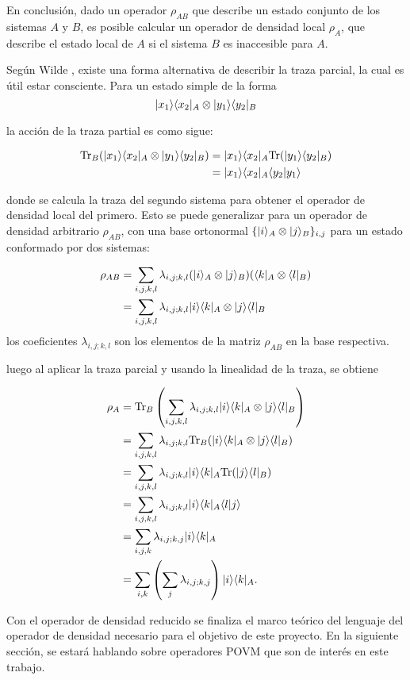 En conclusión, dado un operador $\rho_{AB}$ que describe un estado conjunto de los sistemas $A$ y $B$, es posible calcular un operador de densidad local $\rho_A$, que describe el estado local de $A$ si el sistema $B$ es inaccesible para $A$.


Según Wilde {\cite{wilde2011classical}}, existe una forma alternativa de describir la traza parcial, la cual es útil estar consciente. Para un estado simple de la forma 
\begin{equation}
	|x_1\rangle \langle x_2|_A\otimes|y_1\rangle \langle y_2|_B
\end{equation}

la acción de la traza partial es como sigue:

\begin{equation}
	\begin{split}
	{\rm Tr}_B(	|x_1\rangle \langle x_2|_A\otimes|y_1\rangle \langle y_2|_B)&=|x_1\rangle \langle x_2|_A{\rm Tr}(|y_1\rangle \langle y_2|_B)\\
	&=|x_1\rangle \langle x_2|_A \langle y_2|y_1\rangle
	\end{split}
\end{equation}

donde se calcula la traza del segundo sistema para obtener el operador de densidad local del primero. Esto se puede generalizar para un operador de densidad arbitrario $\rho_{AB}$, con una base ortonormal $\{|i \rangle_A \otimes |j\rangle_B \} _{i,j}$ para un estado conformado por dos sistemas:


\begin{equation}
	\begin{split}
	\rho_{AB}&=\sum_{i,j,k,l}\lambda_{i,j;k,l}(|i\rangle_A \otimes|j\rangle_B)(\langle k|_A\otimes \langle l|_B)\\
	&=\sum_{i,j,k,l}\lambda_{i,j;k,l} |i\rangle \langle k|_A\otimes|j\rangle \langle l|_B
	\end{split}
\end{equation}
los coeficientes $\lambda_{i,j;k,l}$  son los elementos de la matriz $\rho_{AB}$ en la base respectiva.


luego al aplicar la traza parcial y usando la linealidad de la traza, se obtiene


\begin{equation}
	\begin{split}
		\rho_A&={\rm Tr}_B\left(\sum_{i,j,k,l}\lambda_{i,j;k,l} |i\rangle \langle k|_A\otimes|j\rangle \langle l|_B\right)\\
		&=\sum_{i,j,k,l}\lambda_{i,j;k,l} {\rm Tr}_B(|i\rangle \langle k|_A\otimes|j\rangle \langle l|_B)\\
		&=\sum_{i,j,k,l}\lambda_{i,j;k,l}|i\rangle \langle k|_A {\rm Tr}(|j\rangle \langle l|_B)\\
		&=\sum_{i,j,k,l}\lambda_{i,j;k,l}|i\rangle \langle k|_A \langle l|j\rangle \\
		&=\sum_{i,j,k}\lambda_{i,j;k,j}|i\rangle \langle k|_A\\
		&=\sum_{i,k}\left(\sum_j\lambda_{i,j;k,j}\right)|i\rangle \langle k|_A.
	\end{split}
\end{equation}



Con el operador de densidad reducido se finaliza el marco teórico del lenguaje del operador de densidad necesario para el objetivo de este proyecto. En la siguiente sección, se estará hablando sobre operadores POVM que son de interés en este trabajo.



